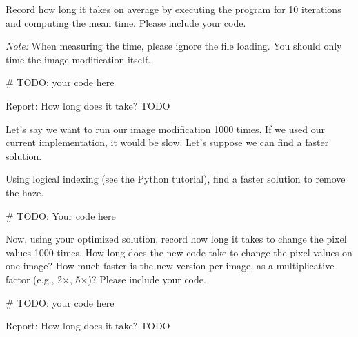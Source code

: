 \documentclass{csci1430}
\begin{document}
\begin{subsubquestion}[points=1]
Record how long it takes on average by executing the program for 10 iterations and computing the mean time. Please include your code.
\end{subsubquestion}

\emph{Note: } When measuring the time, please ignore the file loading. You should only time the image modification itself.

\begin{answer}[height=30]
\begin{python}
# TODO: your code here
\end{python}

Report: How long does it take? TODO
\end{answer}

\pagebreak
\begin{subquestion}[points=3,drawbox=false]
Let's say we want to run our image modification 1000 times. If we used our current implementation, it would be slow. Let's suppose we can find a faster solution.
\end{subquestion}

\begin{subsubquestion}[points=2]
Using logical indexing (see the Python tutorial), find a faster solution to remove the haze. 
\end{subsubquestion}

\begin{answer}[height=25]
\begin{python}
# TODO: Your code here
\end{python}
\end{answer}


\pagebreak
\begin{subsubquestion}[points=1]
Now, using your optimized solution, record how long it takes to change the pixel values 1000 times. How long does the new code take to change the pixel values on one image? How much faster is the new version per image, as a
multiplicative factor (e.g., 2$\times$, 5$\times$)? Please include your code.
\end{subsubquestion}

\begin{answer}[height=30]
\begin{python}
# TODO: your code here
\end{python}

Report: How long does it take? TODO 

\end{answer}
\end{document}
